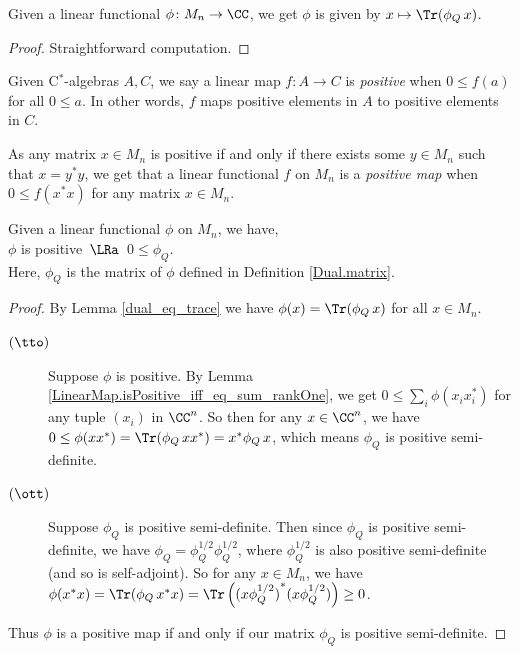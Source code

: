   \begin{lemma}\label{dual_eq_trace}\leanok
   Given a linear functional $\phi\colon M_n\to\CC$, we get $\phi$ is given by $x\mapsto\Tr(\phi_Q \,x)$.
  \end{lemma}
  \begin{proof}\leanok
   Straightforward computation.
  \end{proof}

  \begin{definition}\label{LinearMap.IsPosMap}\leanok
   Given C$^*$-algebras $A,C$, we say a linear map $f\colon A \to C$ is \textit{positive} when $0\leq f(a)$ for all $0\leq a$. In other words, $f$ maps positive elements in $A$ to positive elements in $C$.
  \end{definition}

  As any matrix $x\in{M_n}$ is positive if and only if there exists some $y\in M_n$ such that $x=y^*y$, we get that a linear functional $f$ on $M_n$ is a \textit{positive map} when $0\leq{f(x^*x)}$ for any matrix $x\in{M_n}$.

  \begin{lemma}\label{Dual.isPosMap_iff_of_matrix}\leanok
   Given a linear functional $\phi$ on $M_n$, we have,\\
   \hspace*{0.5cm}$\phi$ is positive $\,\LRa\,$ $0\leq\phi_Q$.\\
   Here, $\phi_Q$ is the matrix of $\phi$ defined in Definition \ref{Dual.matrix}.
  \end{lemma}
  \begin{proof}\leanok
   By Lemma \ref{dual_eq_trace} we have $\phi(x)=\Tr(\phi_Q\, x)$ for all $x\in{M_n}$.
   \begin{description}
    \item[$(\tto)$]
     Suppose $\phi$ is positive. By Lemma \ref{LinearMap.isPositive_iff_eq_sum_rankOne}, we get $0\leq\sum_i\phi(x_ix_i^*)$ for any tuple $(x_i)$ in $\CC^n$. So then for any $x\in\CC^n$, we have $0\leq\phi(xx^*)=\Tr(\phi_Q\, xx^*)=x^*\phi_Q\, x$, which means $\phi_Q$ is positive semi-definite.
    \item[$(\ott)$]
     Suppose $\phi_Q$ is positive semi-definite. Then since $\phi_Q$ is positive semi-definite, we have $\phi_Q=\phi_Q^{1/2}\phi_Q^{1/2}$, where $\phi_Q^{1/2}$ is also positive semi-definite (and so is self-adjoint). So for any $x\in{M_n}$, we have $\phi(x^*x)=\Tr(\phi_Q\, x^*x)=\Tr\left({(x\phi_Q^{1/2})}^*(x\phi_Q^{1/2})\right)\geq0$.
   \end{description}
   Thus $\phi$ is a positive map if and only if our matrix $\phi_Q$ is positive semi-definite.
  \end{proof}

